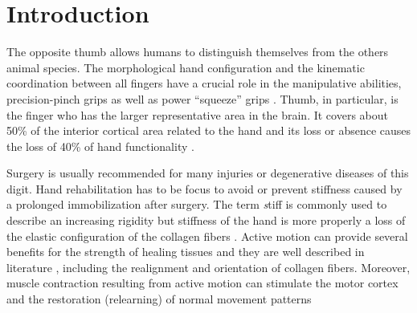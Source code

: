 \documentclass{bmcart}
\begin{document}


\section*{Introduction}

The opposite thumb allows humans to distinguish themselves from the others animal species. The morphological hand configuration and the kinematic coordination between all fingers have a crucial role in the manipulative abilities, precision-pinch grips as well as power “squeeze” grips \cite{napier1956prehensile} \cite{marzke1997precision} \cite{marzke1992evolution}. Thumb, in particular, is the finger who has the larger representative area in the brain. It covers about 50\% of the interior cortical area related to the hand and its loss or absence causes the loss of 40\% of hand functionality \cite{flatt2002our}. 

Surgery is usually recommended for many injuries or degenerative diseases of this digit. Hand rehabilitation has to be focus to avoid or prevent stiffness caused by a prolonged immobilization after surgery.
The term \textit stiff is commonly used to describe an increasing rigidity but stiffness of the hand is more properly a loss of the elastic configuration of the collagen fibers \cite{frank1984physiology}. Active motion can provide several benefits for the strength of healing tissues and they are well described in literature \cite{akeson1987effects} \cite{cyr1998controlled} \cite{gelberman1981influence}, including the realignment and orientation of collagen fibers. Moreover, muscle contraction resulting from active motion can stimulate the motor cortex and the restoration (relearning) of normal movement patterns
\end{document}
